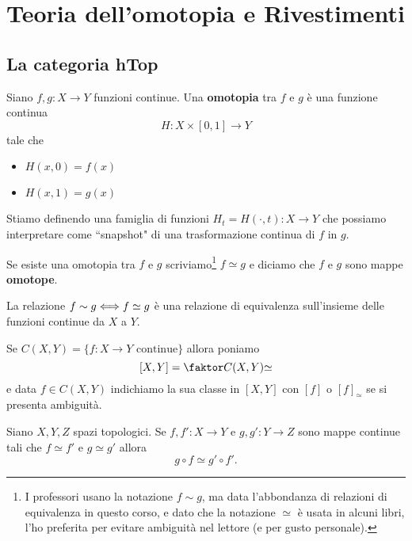 \chapter{Teoria dell'omotopia e Rivestimenti}
\setlength{\parindent}{2pt}

\begin{multicols*}{2}


\section{La categoria hTop}
\begin{definition}[Omotopia]
Siano $f,g:X\to Y$ funzioni continue. Una \textbf{omotopia} tra $f$ e $g$ è una funzione continua
\[H:X\times [0,1]\to Y\]
tale che
\begin{itemize}[noitemsep]
\item $H(x,0)=f(x)$
\item $H(x,1)=g(x)$
\end{itemize}
\end{definition}
\begin{remark}
Stiamo definendo una famiglia di funzioni $H_t=H(\cdot,t):X\to Y$ che possiamo interpretare come ``snapshot" di una trasformazione continua di $f$ in $g$.
\end{remark}

\begin{notation}
Se esiste una omotopia tra $f$ e $g$ scriviamo\footnote{I professori usano la notazione $f\sim g$, ma data l'abbondanza di relazioni di equivalenza in questo corso, e dato che la notazione $\simeq$ è usata in alcuni libri, l'ho preferita per evitare ambiguità nel lettore (e per gusto personale).} $f\simeq g$ e diciamo che $f$ e $g$ sono mappe \textbf{omotope}.
\end{notation}

\begin{proposition}\label{OmotopiaTraMappeERelazioneEquivalenza}
La relazione $f\sim g\Longleftrightarrow f\simeq g$ è una relazione di equivalenza sull'insieme delle funzioni continue da $X$ a $Y$.
\end{proposition}
\begin{notation}
Se $C(X,Y)=\{f:X\to Y\text{ continue}\}$ allora poniamo
\[[X,Y]=\quot{C(X,Y)}\simeq\]
e data $f\in C(X,Y)$ indichiamo la sua classe in $[X,Y]$ con $[f]$ o $[f]_\simeq$ se si presenta ambiguità.
\end{notation}

\begin{proposition}\label{ComposizioneDiOmotopeDaOmotope}
Siano $X,Y,Z$ spazi topologici. Se $f,f':X\to Y$ e $g,g':Y\to Z$ sono mappe continue tali che $f\simeq f'$ e $g\simeq g'$ allora
\[g\circ f\simeq g'\circ f'.\]
\end{proposition}


\end{multicols*}
